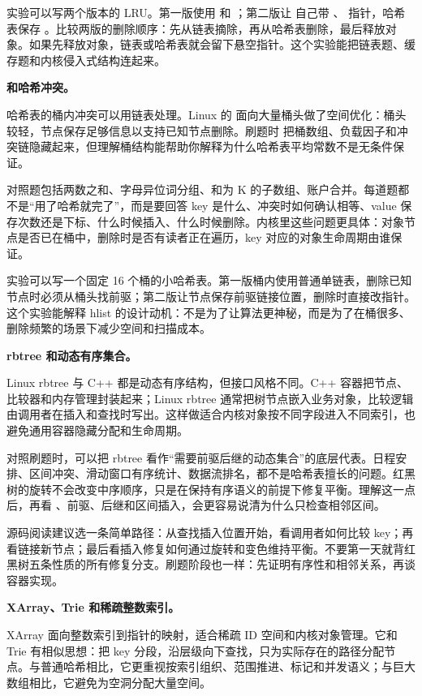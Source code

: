 实验可以写两个版本的 LRU。第一版使用  和 ；第二版让  自己带 、 指针，哈希表保存 。比较两版的删除顺序：先从链表摘除，再从哈希表删除，最后释放对象。如果先释放对象，链表或哈希表就会留下悬空指针。这个实验能把链表题、缓存题和内核侵入式结构连起来。

\noindent\textbf{ 和哈希冲突。}

哈希表的桶内冲突可以用链表处理。Linux 的  面向大量桶头做了空间优化：桶头较轻，节点保存足够信息以支持已知节点删除。刷题时  把桶数组、负载因子和冲突链隐藏起来，但理解桶结构能帮助你解释为什么哈希表平均常数不是无条件保证。

对照题包括两数之和、字母异位词分组、和为 K 的子数组、账户合并。每道题都不是“用了哈希就完了”，而是要回答 key 是什么、冲突时如何确认相等、value 保存次数还是下标、什么时候插入、什么时候删除。内核里这些问题更具体：对象节点是否已在桶中，删除时是否有读者正在遍历，key 对应的对象生命周期由谁保证。

实验可以写一个固定 16 个桶的小哈希表。第一版桶内使用普通单链表，删除已知节点时必须从桶头找前驱；第二版让节点保存前驱链接位置，删除时直接改指针。这个实验能解释 hlist 的设计动机：不是为了让算法更神秘，而是为了在桶很多、删除频繁的场景下减少空间和扫描成本。

\noindent\textbf{rbtree 和动态有序集合。}

Linux rbtree 与 C++  都是动态有序结构，但接口风格不同。C++ 容器把节点、比较器和内存管理封装起来；Linux rbtree 通常把树节点嵌入业务对象，比较逻辑由调用者在插入和查找时写出。这样做适合内核对象按不同字段进入不同索引，也避免通用容器隐藏分配和生命周期。

对照刷题时，可以把 rbtree 看作“需要前驱后继的动态集合”的底层代表。日程安排、区间冲突、滑动窗口有序统计、数据流排名，都不是哈希表擅长的问题。红黑树的旋转不会改变中序顺序，只是在保持有序语义的前提下修复平衡。理解这一点后，再看 、前驱、后继和区间插入，会更容易说清为什么只检查相邻区间。

源码阅读建议选一条简单路径：从查找插入位置开始，看调用者如何比较 key；再看链接新节点；最后看插入修复如何通过旋转和变色维持平衡。不要第一天就背红黑树五条性质的所有修复分支。刷题阶段也一样：先证明有序性和相邻关系，再谈容器实现。

\noindent\textbf{XArray、Trie 和稀疏整数索引。}

XArray 面向整数索引到指针的映射，适合稀疏 ID 空间和内核对象管理。它和 Trie 有相似思想：把 key 分段，沿层级向下查找，只为实际存在的路径分配节点。与普通哈希相比，它更重视按索引组织、范围推进、标记和并发语义；与巨大数组相比，它避免为空洞分配大量空间。

